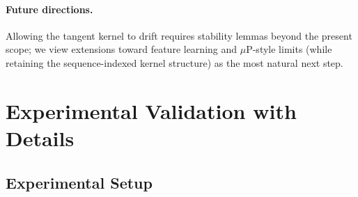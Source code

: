 \documentclass[11pt]{article}
\theoremstyle{plain}
\begin{document}
\paragraph{Future directions.} Allowing the tangent kernel to drift requires stability lemmas beyond the present scope; we view extensions toward feature learning and $\mu$P-style limits \citep{ynh+22} (while retaining the sequence-indexed kernel structure) as the most natural next step.

\newpage


\newpage

\section{Experimental Validation with Details}\label{app:exp_full}

\subsection{Experimental Setup}
\end{document}
